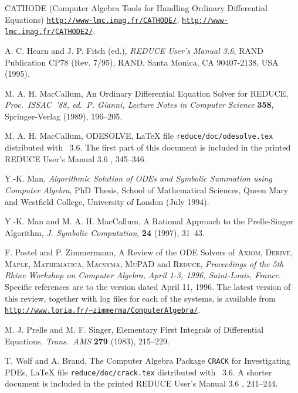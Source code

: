 \begin{thebibliography}{99}

 CATHODE (Computer Algebra Tools for Handling
Ordinary Differential Equations)
\href{http://www-lmc.imag.fr/CATHODE/}%
{\texttt{http://www-lmc.imag.fr/CATHODE/}},
\href{http://www-lmc.imag.fr/CATHODE2/}%
{\texttt{http://www-lmc.imag.fr/CATHODE2/}}.

 A. C. Hearn and J. P. Fitch (ed.),
\textit{REDUCE User's Manual 3.6}, RAND Publication CP78 (Rev. 7/95),
RAND, Santa Monica, CA 90407-2138, USA (1995).

 M. A. H. MacCallum, An Ordinary Differential
Equation Solver for REDUCE, \textit{Proc.\ ISSAC~'88, ed.\ P. Gianni,
Lecture Notes in Computer Science} \textbf{358}, Springer-Verlag
(1989), 196--205.

 M. A. H. MacCallum, ODESOLVE, \LaTeX{} file
\texttt{reduce/doc/odesolve.tex} distributed with \REDUCE~3.6.  The
first part of this document is included in the printed REDUCE User's
Manual 3.6 \cite{Hearn-manual}, 345--346.

 Y.-K. Man, \textit{Algorithmic Solution of ODEs and
Symbolic Summation using Computer Algebra}, PhD Thesis, School of
Mathematical Sciences, Queen Mary and Westfield College, University of
London (July 1994).

 Y.-K. Man and M. A. H. MacCallum, A Rational
Approach to the Prelle-Singer Algorithm, \textit{J. Symbolic
Computation}, \textbf{24} (1997), 31--43.

 F. Postel and P. Zimmermann, A Review of the ODE
Solvers of \textsc{Axiom}, \textsc{Derive}, \textsc{Maple},
\textsc{Mathematica}, \textsc{Macsyma}, \textsc{MuPAD} and
\textsc{Reduce}, \textit{Proceedings of the 5th Rhine Workshop on
Computer Algebra, April 1-3, 1996, Saint-Louis, France.}
Specific references are to the version dated April 11, 1996.
The latest version of this review, together with log files for each of
the systems, is available from
\href{http://www.loria.fr/~zimmerma/ComputerAlgebra/}%
{\texttt{http://www.loria.fr/\textasciitilde zimmerma/ComputerAlgebra/}}.

 M. J. Prelle and M. F. Singer, Elementary
First Integrals of Differential Equations, \textit{Trans.\ AMS}
\textbf{279} (1983), 215--229.

 T. Wolf and A. Brand, The Computer Algebra Package
\texttt{CRACK} for Investigating PDEs, \LaTeX{} file
\texttt{reduce/doc/crack.tex} distributed with \REDUCE~3.6.  A shorter
document is included in the printed REDUCE User's Manual 3.6
\cite{Hearn-manual}, 241--244.


\end{thebibliography}
